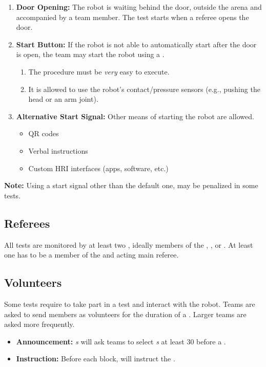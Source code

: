 \begin{enumerate}
	\item \textbf{Door Opening:} The robot is waiting behind the door, outside the arena and accompanied by a team member.
	The test starts when a referee opens the door.

	\item \textbf{Start Button:} If the robot is not able to automatically start after the door is open, the team may start the robot using a \StartButton{}.
	\begin{enumerate}[nosep]
		\item The procedure must be \emph{very} easy to execute.
		\item It is allowed to use the robot's contact/pressure sensors (e.g., pushing the head or an arm joint).
	\end{enumerate}

	\item \textbf{Alternative Start Signal:} Other means of starting the robot are allowed.
	\begin{itemize}[nosep]
		\item QR codes
		\item Verbal instructions
		\item Custom HRI interfaces (apps, software, etc.)
	\end{itemize}
\end{enumerate}
\noindent\textbf{Note:} Using a start signal other than the default one, may be penalized in some tests.


\subsection{Referees}
\label{sec:rules:referees}
All tests are monitored by at least two \Referees{}, ideally members of the , , or . At least one has to be a member of the  and acting main referee.


\subsection{Volunteers}
\label{sec:rules:volunteers}
Some tests require \Volunteers{} to take part in a test and interact with the robot. Teams are asked to send members as volunteers for the duration of a \Testblock{}. Larger teams are asked more frequently.
\begin{itemize}
	\item \textbf{Announcement:} \Referee\textit{s} will ask teams to select \Volunteer\textit{s} at least \SI{30}{\min} before a \Testblock{}.
	\item \textbf{Instruction:} Before each block, \Referees{} will instruct the \Volunteers{}.
\end{itemize}


